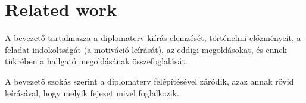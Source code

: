 \chapter{Related work}

A bevezető tartalmazza a diplomaterv-kiírás elemzését, történelmi előzményeit, 
a feladat indokoltságát (a motiváció leírását), az eddigi megoldásokat, 
és ennek tükrében a hallgató megoldásának összefoglalását.

A bevezető szokás szerint a diplomaterv felépítésével záródik, 
azaz annak rövid leírásával, hogy melyik fejezet mivel foglalkozik.
